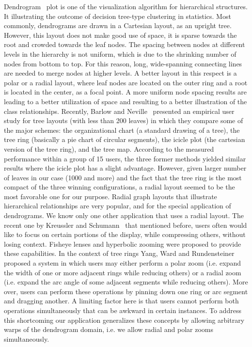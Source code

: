 Dendrogram~\cite{Dendrogram} plot is one of the visualization algorithm for hierarchical structures. It illustrating the outcome of decision tree-type clustering in statistics.
Most commonly, dendrograms are drawn in a Cartesian layout, as an upright tree. However, this layout does not make good use of space, it is sparse towards the root and crowded towards the leaf nodes.
The spacing between nodes at different levels in the hierarchy is not uniform, which is due to the shrinking number of nodes from bottom to top. For this reason, long, wide-spanning connecting lines are needed to merge nodes at higher levels.
A better layout in this respect is a polar or a radial layout, where leaf nodes are located on the outer ring and a root is located in the center, as a focal point.
A more uniform node spacing results are leading to a better utilization of space and resulting to a better illustration of the class relationships.
Recently, Barlow and Neville~\cite{Barlow_Neville} presented an empirical user study for tree layouts (with less than 200 leaves) in which they compare some of the major schemes: the organizational chart (a standard drawing of a tree),
the tree ring (basically a pie chart of circular segments), the icicle plot (the cartesian version of the tree ring), and the tree map. According to the measured performance within a group of 15 users,
the three former methods yielded similar results where the icicle plot has a slight advantage. However, given larger number of leaves in our case (1000 and more) and the fact that the tree ring is the most compact of the three winning configurations,
a radial layout seemed to be the most favorable one for our purpose. Radial graph layouts that illustrate hierarchical relationships are very popular, and for the special application of dendrograms.
We know only one other application that uses a radial layout. The recent one by Kreussler and Schumann~\cite{Kreussler_Schumann} that mentioned before, users often would like to focus on certain portions of the display,
while compressing others, without losing context. Fisheye lenses and hyperbolic zooming were proposed to provide these capabilities.
In the context of tree rings Yang, Ward and Rundensteiner~\cite{Yang_Ward} proposed a system in which users may either perform a polar zoom (i.e. expand the width of one or more adjacent rings while reducing others) or
a radial zoom (i.e. expand the arc angle of some adjacent segments while reducing others). More over, users can perform these operations by pinning down one ring or arc segment and dragging another.
A limiting factor here is that users cannot perform both operations simultaneously that can be awkward in certain instances. To address this shortcoming
our application generalizes these concepts by allowing arbitrary warps of the dendrogram domain, i.e. we allow radial and polar zooms simultaneously.


